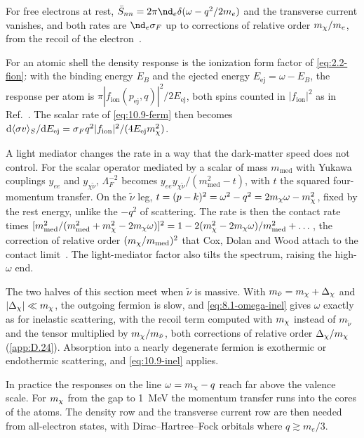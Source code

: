 \noindent For free electrons at rest, $\bar S_{nn} = 2\pi\nd_e\delta(\omega - q^2/2m_e)$ and the transverse current vanishes, and both rates are $\nd_e\sigma_F$ up to corrections of relative order $m_{\chi}/m_e$, from the recoil of the electron~\cite[Eqs.~(1), (2) and (10)]{dror2021absorption}.

For an atomic shell the density response is the ionization form factor of \cref{eq:2.2-fion}: with the binding energy $E_B$ and the ejected energy $E_{\mathrm{ej}} = \omega - E_B$, the response per atom is $\pi|f_{\mathrm{ion}}(p_{\mathrm{ej}},q)|^2/2E_{\mathrm{ej}}$, both spins counted in $|f_{\mathrm{ion}}|^2$ as in Ref.~\cite[Eqs.~(A.18)--(A.21)]{essig2016direct}. The scalar rate of \cref{eq:10.9-ferm} then becomes $\mathrm{d}\langle\sigma v\rangle_S/\mathrm{d} E_{\mathrm{ej}} = \sigma_Fq^2|f_{\mathrm{ion}}|^2/(4E_{\mathrm{ej}}m_{\chi}^2)$.

A light mediator changes the rate in a way that the dark-matter speed does not control. For the scalar operator mediated by a scalar of mass $m_{\mathrm{med}}$ with Yukawa couplings $y_{ee}$ and $y_{\chi\tilde\nu}$, $\Lambda_F^{-2}$ becomes $y_{ee}y_{\chi\tilde\nu}/(m_{\mathrm{med}}^2 - t)$, with $t$ the squared four-momentum transfer. On the $\tilde\nu$ leg, $t = (p - k)^2 = \omega^2 - q^2 = 2m_{\chi}\omega - m_{\chi}^2$, fixed by the rest energy, unlike the $-q^2$ of scattering. The rate is then the contact rate times $[m_{\mathrm{med}}^2/(m_{\mathrm{med}}^2 + m_{\chi}^2 - 2m_{\chi}\omega)]^2 = 1 - 2(m_{\chi}^2 - 2m_{\chi}\omega)/m_{\mathrm{med}}^2 + \dots$, the correction of relative order $(m_{\chi}/m_{\mathrm{med}})^2$ that Cox, Dolan and Wood attach to the contact limit~\cite[Eqs.~(1), (2), (14) and (15)]{cox2024absorption}. The light-mediator factor also tilts the spectrum, raising the high-$\omega$ end.

The two halves of this section meet when $\tilde\nu$ is massive. With $m_{\tilde\nu} = m_{\chi} + \Delta_\chi$ and $|\Delta_\chi| \ll m_{\chi}$, the outgoing fermion is slow, and \cref{eq:8.1-omega-inel} gives $\omega$ exactly as for inelastic scattering, with the recoil term computed with $m_{\chi}$ instead of $m_{\tilde\nu}$ and the tensor multiplied by $m_{\chi}/m_{\tilde\nu}$, both corrections of relative order $\Delta_\chi/m_{\chi}$ (\cref{app:D.24}). Absorption into a nearly degenerate fermion is exothermic or endothermic scattering, and \cref{eq:10.9-inel} applies.

In practice the responses on the line $\omega = m_{\chi} - q$ reach far above the valence scale. For $m_{\chi}$ from the gap to \SI{1}{MeV} the momentum transfer runs into the cores of the atoms. The density row and the transverse current row are then needed from all-electron states, with Dirac--Hartree--Fock orbitals where $q \gtrsim m_e/3$.


